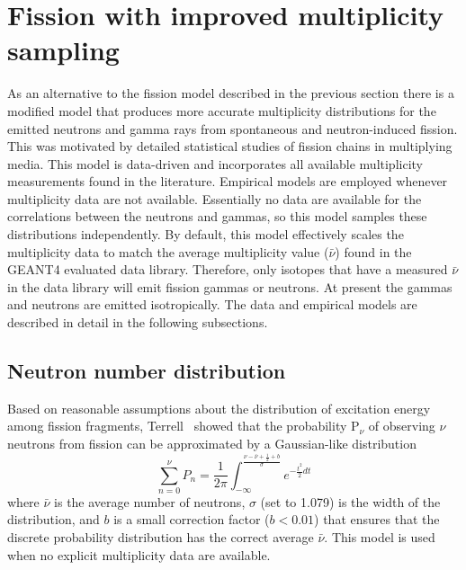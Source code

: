 \documentclass[11pt]{article}
\title{ {\small \hfill \versionnum\\
                \hfill \ucrlnum\\}
        \bf #1}}
\begin{document}
\section{Fission with improved multiplicity sampling}

As an alternative to the fission model described in the previous
section there is a modified model that produces more accurate
multiplicity distributions for the emitted neutrons and gamma rays
from spontaneous and neutron-induced fission. This was motivated by
detailed statistical studies of fission chains in multiplying
media. This model is data-driven and incorporates all available
multiplicity measurements found in the literature. Empirical models
are employed whenever multiplicity data are not available.
Essentially no data are available for the correlations between the
neutrons and gammas, so this model samples these distributions
independently. By default, this model effectively scales the
multiplicity data to match the average multiplicity value
($\bar{\nu}$) found in the GEANT4 evaluated data library. Therefore,
only isotopes that have a measured $\bar{\nu}$ in the data library
will emit fission gammas or neutrons. At present the gammas and
neutrons are emitted isotropically. The data and empirical models are
described in detail in the following subsections.


\subsection{Neutron number distribution}

Based on reasonable assumptions about the distribution of excitation
energy among fission fragments, Terrell~\cite{Terrell 1957} showed
that the probability P$_\nu$ of observing $\nu$ neutrons from fission
can be approximated by a Gaussian-like distribution
\begin{equation}
\sum_{n=0}^{\nu}P_n = \frac{1}{2\pi}\int_{-\infty}^{\frac{\nu-\bar{\nu} 
                    + \frac{1}{2}+b}{\sigma}}e^{-\frac{t^2}{2}dt}
\end{equation}
where $\bar{\nu}$ is the average number of neutrons, $\sigma$ (set to
1.079) is the width of the distribution, and $b$ is a small correction
factor ($b<0.01$) that ensures that the discrete probability
distribution has the correct average $\bar{\nu}$. This model is used
when no explicit multiplicity data are available.
\end{document}
